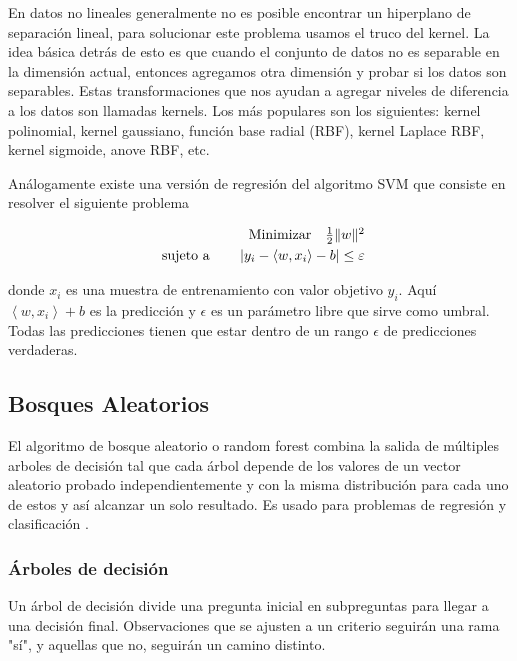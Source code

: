 En datos no lineales generalmente no es posible encontrar un hiperplano de separación lineal, para solucionar este problema usamos el truco del kernel. La idea básica detrás de esto es que cuando el conjunto de datos no es separable en la dimensión actual, entonces agregamos otra dimensión y probar si los datos son separables.
Estas transformaciones que nos ayudan a agregar niveles de diferencia a los datos son llamadas kernels. Los más populares son los siguientes: kernel polinomial, kernel gaussiano, función base radial (RBF), kernel Laplace RBF, kernel sigmoide, anove RBF, etc.  

Análogamente existe una versión de regresión del algoritmo SVM que consiste en resolver el siguiente problema

\[
\begin{array}{r@{}r@{}r@{}l}
	\text{Minimizar} \quad \frac{1}{2}\|w\|^{2} \\[\jot]
	\text{sujeto a}\qquad \left|y_{i}-\left\langle w, x_{i}\right\rangle-b\right| \leq \varepsilon \\
	
\end{array}
\]

donde $x_i$ es una muestra de entrenamiento con valor objetivo $y_i$. Aquí $\left\langle w, x_{i}\right\rangle+b$ es la predicción y $\epsilon$ es un parámetro libre que sirve como umbral. Todas las predicciones tienen que estar dentro de un rango $\epsilon$ de predicciones verdaderas. 

\subsection{Bosques Aleatorios}
El algoritmo de bosque aleatorio o random forest combina la salida de múltiples arboles de decisión tal que cada árbol depende de los valores de un vector aleatorio probado independientemente y con la misma distribución para cada uno de estos y así alcanzar un solo resultado. Es usado para problemas de regresión y clasificación \parencite{WhatRandomForest2021}.

\subsubsection{Árboles de decisión}
Un árbol de decisión divide una pregunta inicial en subpreguntas para llegar a una decisión final. Observaciones que se ajusten a un criterio seguirán una rama "sí", y aquellas que no, seguirán un camino distinto.

